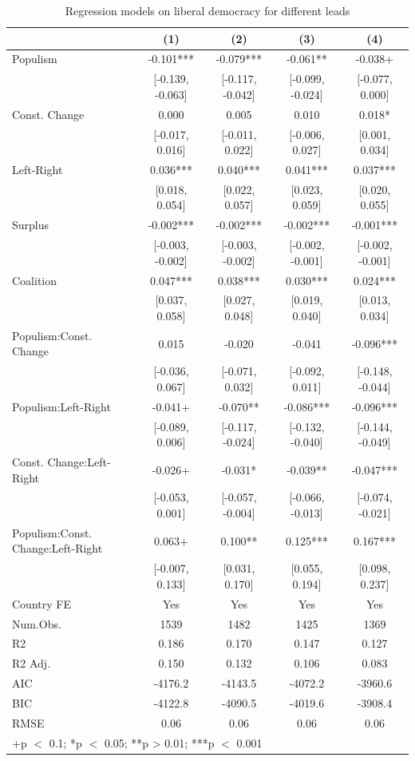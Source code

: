 \documentclass[
  abstract]{article}
\begin{document}
\renewcommand{\arraystretch}{0.5}

\hypertarget{tbl-leadlibdem}{}
\begin{table}
\caption{\label{tbl-leadlibdem}Regression models on liberal democracy for different leads }\tabularnewline

\centering\centering\centering
\begin{tabular}[t]{lcccc}
\toprule
  & (1) & (2) & (3) & (4)\\
\midrule
Populism & -0.101*** & -0.079*** & -0.061** & -0.038+\\
 & {}[-0.139, -0.063] & {}[-0.117, -0.042] & {}[-0.099, -0.024] & {}[-0.077, 0.000]\\
Const. Change & 0.000 & 0.005 & 0.010 & 0.018*\\
 & {}[-0.017, 0.016] & {}[-0.011, 0.022] & {}[-0.006, 0.027] & {}[0.001, 0.034]\\
Left-Right & 0.036*** & 0.040*** & 0.041*** & 0.037***\\
 & {}[0.018, 0.054] & {}[0.022, 0.057] & {}[0.023, 0.059] & {}[0.020, 0.055]\\
Surplus & -0.002*** & -0.002*** & -0.002*** & -0.001***\\
 & {}[-0.003, -0.002] & {}[-0.003, -0.002] & {}[-0.002, -0.001] & {}[-0.002, -0.001]\\
Coalition & 0.047*** & 0.038*** & 0.030*** & 0.024***\\
 & {}[0.037, 0.058] & {}[0.027, 0.048] & {}[0.019, 0.040] & {}[0.013, 0.034]\\
Populism:Const. Change & 0.015 & -0.020 & -0.041 & -0.096***\\
 & {}[-0.036, 0.067] & {}[-0.071, 0.032] & {}[-0.092, 0.011] & {}[-0.148, -0.044]\\
Populism:Left-Right & -0.041+ & -0.070** & -0.086*** & -0.096***\\
 & {}[-0.089, 0.006] & {}[-0.117, -0.024] & {}[-0.132, -0.040] & {}[-0.144, -0.049]\\
Const. Change:Left-Right & -0.026+ & -0.031* & -0.039** & -0.047***\\
 & {}[-0.053, 0.001] & {}[-0.057, -0.004] & {}[-0.066, -0.013] & {}[-0.074, -0.021]\\
Populism:Const. Change:Left-Right & 0.063+ & 0.100** & 0.125*** & 0.167***\\
 & {}[-0.007, 0.133] & {}[0.031, 0.170] & {}[0.055, 0.194] & {}[0.098, 0.237]\\
\midrule
Country FE & Yes & Yes & Yes & Yes\\
Num.Obs. & 1539 & 1482 & 1425 & 1369\\
R2 & 0.186 & 0.170 & 0.147 & 0.127\\
R2 Adj. & 0.150 & 0.132 & 0.106 & 0.083\\
AIC & -4176.2 & -4143.5 & -4072.2 & -3960.6\\
BIC & -4122.8 & -4090.5 & -4019.6 & -3908.4\\
RMSE & 0.06 & 0.06 & 0.06 & 0.06\\
\bottomrule
\multicolumn{5}{l}{\rule{0pt}{1em}+p $<$ 0.1; *p $<$ 0.05; **p > 0.01; ***p $<$ 0.001}\\
\end{tabular}
\end{table}
\end{document}

